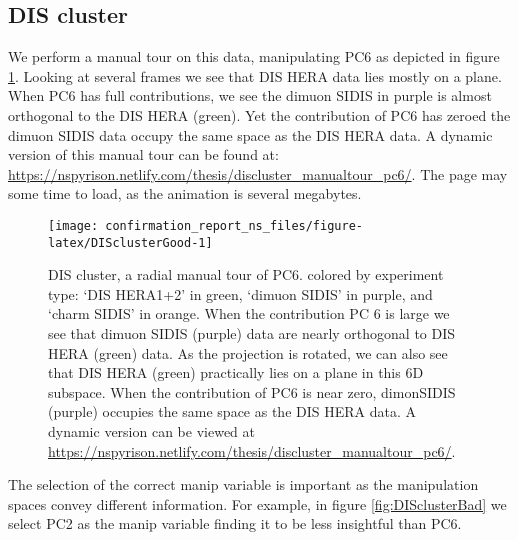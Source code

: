 \documentclass{monashthesis}
\begin{document}
\subsection{DIS cluster}\label{dis-cluster}

We perform a manual tour on this data, manipulating PC6 as depicted in
figure \ref{fig:DISclusterGood}. Looking at several frames we see that
DIS HERA data lies mostly on a plane. When PC6 has full contributions,
we see the dimuon SIDIS in purple is almost orthogonal to the DIS HERA
(green). Yet the contribution of PC6 has zeroed the dimuon SIDIS data
occupy the same space as the DIS HERA data. A dynamic version of this
manual tour can be found at:
\url{https://nspyrison.netlify.com/thesis/discluster_manualtour_pc6/}.
The page may some time to load, as the animation is several megabytes.











\begin{figure}

{\centering \texttt{[image: confirmation\_report\_ns\_files/figure-latex/DISclusterGood-1]} 

}

\caption{DIS cluster, a radial manual tour of PC6.
colored by experiment type: `DIS HERA1+2' in green, `dimuon SIDIS' in
purple, and `charm SIDIS' in orange. When the contribution PC 6 is large
we see that dimuon SIDIS (purple) data are nearly orthogonal to DIS HERA
(green) data. As the projection is rotated, we can also see that DIS
HERA (green) practically lies on a plane in this 6D subspace. When the
contribution of PC6 is near zero, dimonSIDIS (purple) occupies the same
space as the DIS HERA data. A dynamic version can be viewed at
\url{https://nspyrison.netlify.com/thesis/discluster_manualtour_pc6/}.}\label{fig:DISclusterGood}
\end{figure}

The selection of the correct manip variable is important as the
manipulation spaces convey different information. For example, in figure
\ref{fig:DISclusterBad} we select PC2 as the manip variable finding it
to be less insightful than PC6.
\end{document}
